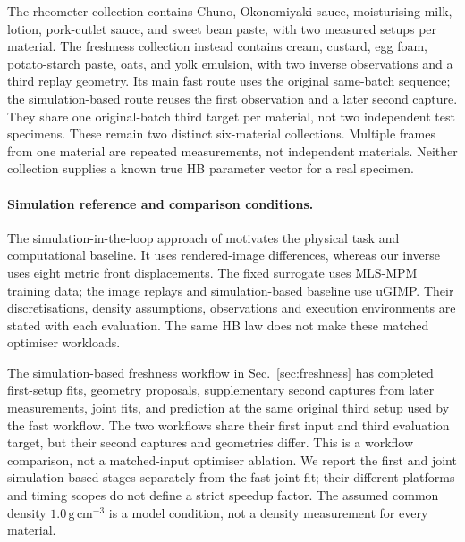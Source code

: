 The rheometer collection contains Chuno, Okonomiyaki sauce,
moisturising milk, lotion, pork-cutlet sauce, and sweet bean paste,
with two measured setups per material. The freshness collection
instead contains cream, custard, egg foam, potato-starch paste,
oats, and yolk emulsion, with two inverse observations and a third
replay geometry. Its main fast route uses the original same-batch
sequence; the simulation-based route reuses the first observation
and a later second capture. They share one original-batch
third target per material, not two independent test specimens.
These remain two distinct six-material collections.
Multiple frames from one material are repeated measurements, not
independent materials. Neither collection supplies a known true HB
parameter vector for a real specimen.

\paragraph{Simulation reference and comparison conditions.}
The simulation-in-the-loop approach of
\citet{hamamichi2023nonnewtonian} motivates the physical task and
computational baseline. It uses rendered-image differences, whereas
our inverse uses eight metric front displacements. The fixed surrogate
uses MLS-MPM training data; the image replays and simulation-based
baseline use uGIMP. Their discretisations, density assumptions,
observations and execution environments are stated with each evaluation.
The same HB law does not make these matched optimiser workloads.

The simulation-based freshness workflow in Sec.~\ref{sec:freshness}
has completed first-setup fits, geometry proposals, supplementary
second captures from later measurements, joint fits, and prediction
at the same original third setup used by the fast workflow. The two
workflows share their first input and third evaluation target, but
their second captures and geometries differ. This is a workflow
comparison, not a matched-input optimiser ablation. We report the
first and joint simulation-based stages separately from the fast joint
fit; their different platforms and timing scopes do not define a strict
speedup factor. The assumed common density
$1.0\,\mathrm{g\,cm}^{-3}$ is a model condition, not a density
measurement for every material.

